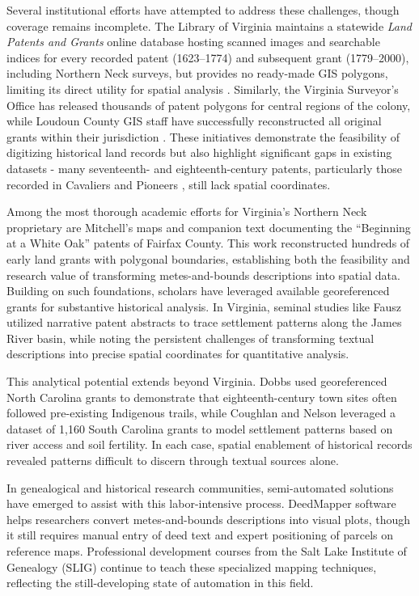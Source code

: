 Several institutional efforts have attempted to address these
challenges, though coverage remains incomplete. The Library of Virginia
maintains a statewide \emph{Land Patents and Grants} online database
hosting scanned images and searchable indices for every recorded patent
(1623--1774) and subsequent grant (1779--2000), including Northern Neck
surveys, but provides no ready-made GIS polygons, limiting its direct
utility for spatial analysis \citep{lva_patents_db}. Similarly, the
Virginia Surveyor's Office has released thousands of patent polygons for
central regions of the colony, while Loudoun County GIS staff have
successfully reconstructed all original grants within their jurisdiction
\citep{loudoun_grants_dataset}. These initiatives demonstrate the
feasibility of digitizing historical land records but also highlight
significant gaps in existing datasets - many seventeenth- and
eighteenth-century patents, particularly those recorded in Cavaliers and
Pioneers \citep{Nugent1979_cavaliers3}, still lack spatial coordinates.

Among the most thorough academic efforts for Virginia's Northern Neck
proprietary are Mitchell's \citep{mitchell1977whiteoak} maps and
companion text documenting the ``Beginning at a White Oak'' patents of
Fairfax County. This work reconstructed hundreds of early land grants
with polygonal boundaries, establishing both the feasibility and
research value of transforming metes-and-bounds descriptions into
spatial data. Building on such foundations, scholars have leveraged
available georeferenced grants for substantive historical analysis. In
Virginia, seminal studies like Fausz \citep{Fausz1971_settlement}
utilized narrative patent abstracts to trace settlement patterns along
the James River basin, while noting the persistent challenges of
transforming textual descriptions into precise spatial coordinates for
quantitative analysis.

This analytical potential extends beyond Virginia. Dobbs
\citep{Dobbs2009_backcountry} used georeferenced North Carolina grants
to demonstrate that eighteenth-century town sites often followed
pre-existing Indigenous trails, while Coughlan and Nelson
\citep{Coughlan2018_settlement} leveraged a dataset of 1,160 South
Carolina grants to model settlement patterns based on river access and
soil fertility. In each case, spatial enablement of historical records
revealed patterns difficult to discern through textual sources alone.

In genealogical and historical research communities, semi-automated
solutions have emerged to assist with this labor-intensive process.
DeedMapper software \citep{DeedMapper_software} helps researchers
convert metes-and-bounds descriptions into visual plots, though it still
requires manual entry of deed text and expert positioning of parcels on
reference maps. Professional development courses from the Salt Lake
Institute of Genealogy (SLIG) continue to teach these specialized
mapping techniques, reflecting the still-developing state of automation
in this field.

